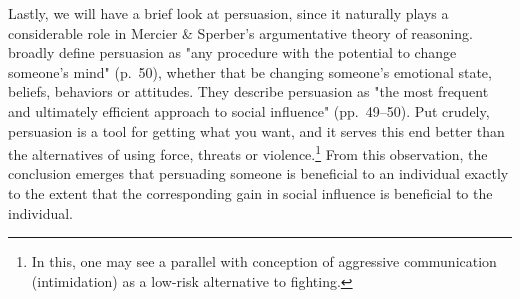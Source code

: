 Lastly, we will have a brief look at persuasion, since it naturally plays a considerable role in Mercier \& Sperber's argumentative theory of reasoning.
\citet{Brinol09} broadly define persuasion as "any procedure with the potential to change someone's mind" (p.~50),
whether that be changing someone's emotional state, beliefs, behaviors or attitudes.
They describe persuasion as "the most frequent and ultimately efficient approach to social influence" (pp.~49--50). Put crudely, persuasion is a tool for getting what you want, and it serves this end better than the alternatives of using force, threats or violence.\footnote{In this, one may see a parallel with  conception of aggressive communication (intimidation) as a low-risk alternative to fighting.}
From this observation, the conclusion emerges that persuading someone is beneficial to an individual exactly to the extent that the corresponding gain in social influence is beneficial to the individual.
